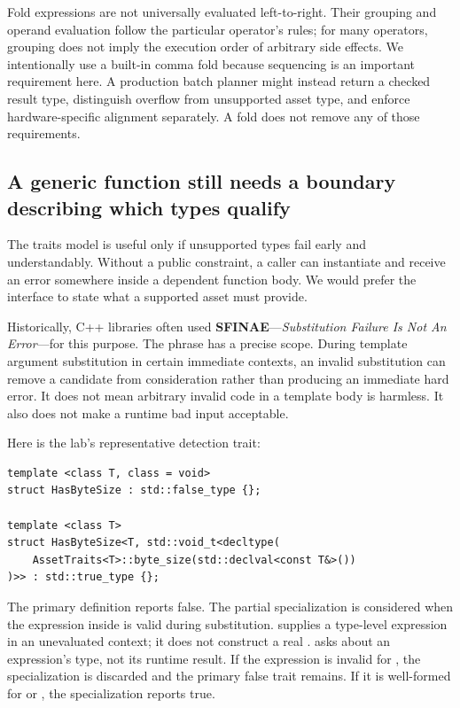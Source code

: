 Fold expressions are not universally evaluated left-to-right. Their grouping and operand evaluation follow the particular operator's rules; for many operators, grouping does not imply the execution order of arbitrary side effects. We intentionally use a built-in comma fold because sequencing is an important requirement here. A production batch planner might instead return a checked result type, distinguish overflow from unsupported asset type, and enforce hardware-specific alignment separately. A fold does not remove any of those requirements.

\subsection{A generic function still needs a boundary describing which types qualify}\label{05-engine-i-ch005-a-generic-function-still-needs-a-boundary-describing-which-types-qualify}

\hypertarget{05-engine-i-ch005-a-generic-function-still-needs-a-boundary-describing-which-types-qualify}{}

The traits model is useful only if unsupported types fail early and understandably. Without a public constraint, a caller can instantiate  and receive an error somewhere inside a dependent function body. We would prefer the interface to state what a supported asset must provide.

Historically, C++ libraries often used \textbf{SFINAE}---\emph{Substitution Failure Is Not An Error}---for this purpose. The phrase has a precise scope. During template argument substitution in certain immediate contexts, an invalid substitution can remove a candidate from consideration rather than producing an immediate hard error. It does not mean arbitrary invalid code in a template body is harmless. It also does not make a runtime bad input acceptable.

Here is the lab's representative detection trait:

\begin{verbatim}
template <class T, class = void>
struct HasByteSize : std::false_type {};

template <class T>
struct HasByteSize<T, std::void_t<decltype(
    AssetTraits<T>::byte_size(std::declval<const T&>())
)>> : std::true_type {};
\end{verbatim}

The primary definition reports false. The partial specialization is considered when the expression inside  is valid during substitution.  supplies a type-level expression in an unevaluated context; it does not construct a real .  asks about an expression's type, not its runtime result. If the expression is invalid for , the specialization is discarded and the primary false trait remains. If it is well-formed for  or , the specialization reports true.


